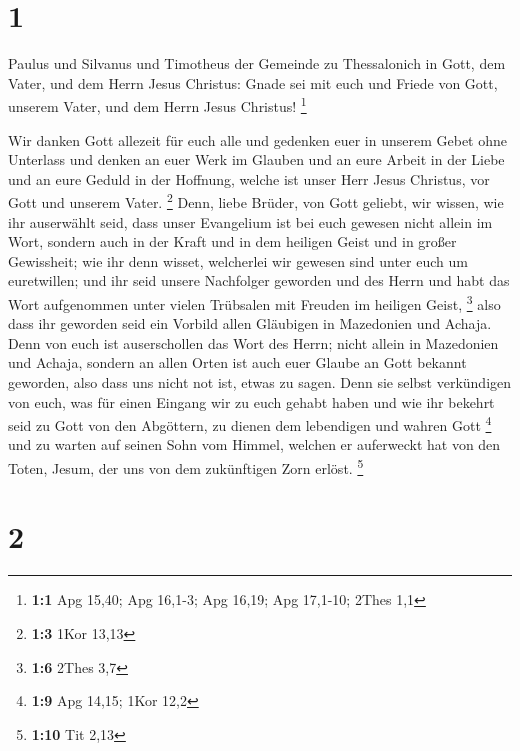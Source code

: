 \hypertarget{section}{%
\section{1}\label{section}}

 Paulus und Silvanus und Timotheus der Gemeinde zu
Thessalonich in Gott, dem Vater, und dem Herrn Jesus Christus: Gnade sei
mit euch und Friede von Gott, unserem Vater, und dem Herrn Jesus
Christus! \footnote{\textbf{1:1} Apg 15,40; Apg 16,1-3; Apg 16,19; Apg
  17,1-10; 2Thes 1,1}

 Wir danken Gott allezeit für euch alle und gedenken euer in
unserem Gebet ohne Unterlass  und denken an euer Werk im
Glauben und an eure Arbeit in der Liebe und an eure Geduld in der
Hoffnung, welche ist unser Herr Jesus Christus, vor Gott und unserem
Vater. \footnote{\textbf{1:3} 1Kor 13,13}  Denn, liebe
Brüder, von Gott geliebt, wir wissen, wie ihr auserwählt seid,
 dass unser Evangelium ist bei euch gewesen nicht allein im
Wort, sondern auch in der Kraft und in dem heiligen Geist und in großer
Gewissheit; wie ihr denn wisset, welcherlei wir gewesen sind unter euch
um euretwillen;  und ihr seid unsere Nachfolger geworden und
des Herrn und habt das Wort aufgenommen unter vielen Trübsalen mit
Freuden im heiligen Geist, \footnote{\textbf{1:6} 2Thes 3,7}
 also dass ihr geworden seid ein Vorbild allen Gläubigen in
Mazedonien und Achaja.  Denn von euch ist auserschollen das
Wort des Herrn; nicht allein in Mazedonien und Achaja, sondern an allen
Orten ist auch euer Glaube an Gott bekannt geworden, also dass uns nicht
not ist, etwas zu sagen.  Denn sie selbst verkündigen von
euch, was für einen Eingang wir zu euch gehabt haben und wie ihr bekehrt
seid zu Gott von den Abgöttern, zu dienen dem lebendigen und wahren Gott
\footnote{\textbf{1:9} Apg 14,15; 1Kor 12,2}  und zu warten
auf seinen Sohn vom Himmel, welchen er auferweckt hat von den Toten,
Jesum, der uns von dem zukünftigen Zorn erlöst. \footnote{\textbf{1:10}
  Tit 2,13}

\hypertarget{section-1}{%
\section{2}\label{section-1}}

